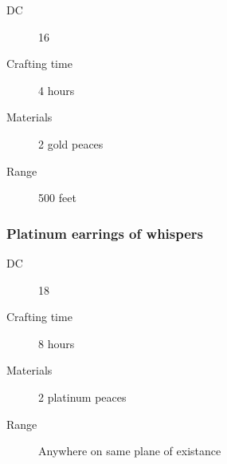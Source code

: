 \begin{description}
\item [DC] 16
\item [Crafting time] 4 hours
\item [Materials] 2 gold peaces
\item [Range] 500 feet
\end{description}

\subsubsection{Platinum earrings of whispers}

\begin{description}
\item [DC] 18
\item [Crafting time] 8 hours
\item [Materials] 2 platinum peaces
\item [Range] Anywhere on same plane of existance
\end{description}

